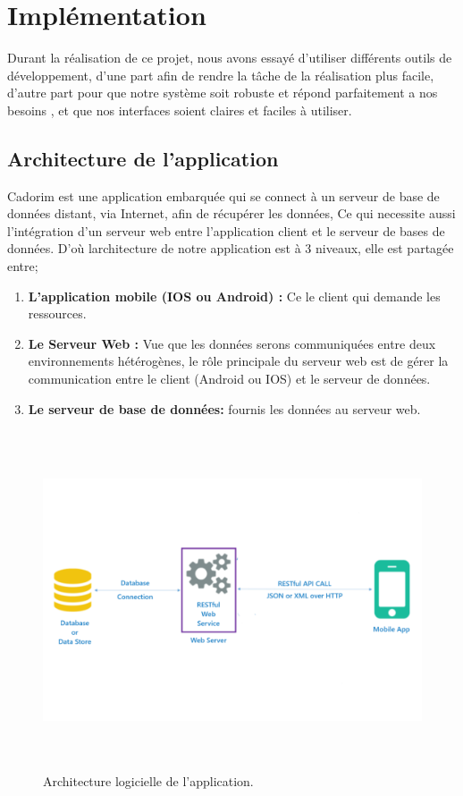 \chapter{Implémentation}
Durant la réalisation de ce projet, nous avons essayé d’utiliser différents
outils de développement, d’une part afin de rendre la tâche de la
réalisation plus facile, d’autre part pour que notre système soit robuste et
répond parfaitement a nos besoins , et que nos interfaces soient claires et
faciles à utiliser.
\section{Architecture de l'application}
Cadorim est une application embarquée qui se connect à un serveur de base de données distant, via Internet, afin de récupérer les données, Ce qui necessite aussi l'intégration d'un serveur web entre l'application client et le serveur de bases de données.
D'où larchitecture de notre application est à 3 niveaux, elle est partagée entre;
\begin{enumerate}
	\item \textbf {L'application mobile (IOS ou Android) : }  Ce le client qui demande les ressources.
	\item \textbf{Le Serveur Web :} Vue que les données serons communiquées entre deux environnements hétérogènes, le rôle principale du serveur web est de gérer la communication entre le client (Android ou IOS) et le serveur de données.
	\item \textbf{Le serveur de base de données:} fournis les données au serveur web.
\end{enumerate}

\begin{figure}[h!]
	\includegraphics[width=17cm, height=10cm]{./Template LaTeX/Images/architect_after_edit.png}
	\caption{Architecture logicielle de l’application.}
	\label{fig:birds}
	
	
\end{figure}
\newpage

